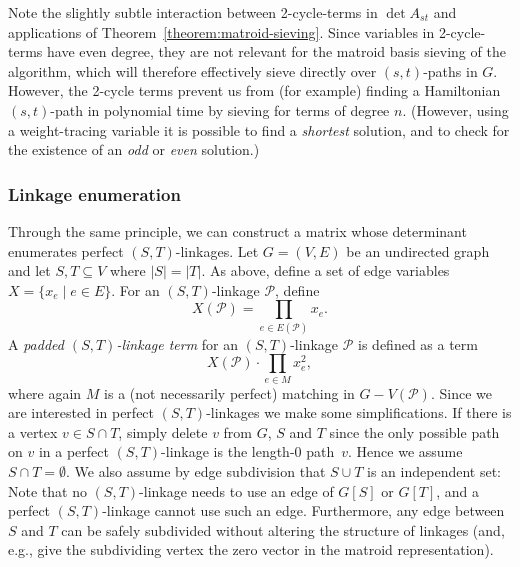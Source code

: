 \documentclass[10pt,a4paper]{article}
\newcommand{\cP}{\ensuremath{\mathcal P}\xspace}
\begin{document}
Note the slightly subtle interaction between 2-cycle-terms in $\det A_{st}$
and applications of Theorem~\ref{theorem:matroid-sieving}. Since variables
in 2-cycle-terms have even degree, they are not relevant for the matroid basis
sieving of the algorithm, which will therefore effectively sieve
directly over $(s,t)$-paths in $G$. However, the 2-cycle terms prevent us
from (for example) finding a Hamiltonian $(s,t)$-path in polynomial time
by sieving for terms of degree $n$. (However, using a weight-tracing
variable it is possible to find a \emph{shortest} solution, and to
check for the existence of an \emph{odd} or \emph{even} solution.)

\subsubsection{Linkage enumeration}

Through the same principle, we can construct a matrix whose
determinant enumerates perfect $(S,T)$-linkages. Let $G=(V,E)$
be an undirected graph and let $S, T \subseteq V$ where $|S|=|T|$.
As above, define a set of edge variables $X=\{x_e \mid e \in E\}$.
For an $(S,T)$-linkage $\cP$, define
\[
  X(\cP) = \prod_{e \in E(\cP)} x_e.
\]
A \emph{padded $(S,T)$-linkage term} for an $(S,T)$-linkage $\cP$ is
defined as a term 
\[
  X(\cP) \cdot \prod_{e \in M} x_e^2,
\]
where again $M$ is a (not necessarily perfect) matching in $G-V(\cP)$.
Since we are interested in perfect $(S,T)$-linkages we make some
simplifications. If there is a vertex $v \in S \cap T$, simply
delete $v$ from $G$, $S$ and $T$ since the only possible path on $v$
in a perfect $(S,T)$-linkage is the length-0 path~$v$. Hence we assume
$S \cap T = \emptyset$.
We also assume by edge subdivision that $S \cup T$ is an independent set:
Note that no $(S,T)$-linkage needs to use an edge of $G[S]$ or $G[T]$,
and a perfect $(S,T)$-linkage cannot use such an edge.
Furthermore, any edge between $S$ and $T$ can be safely subdivided
without altering the structure of linkages (and, e.g., give the subdividing vertex
the zero vector in the matroid representation).
\end{document}
